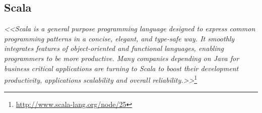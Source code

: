 \subsection{Scala} \label{bg_scala}
\textit{<<Scala is a general purpose programming language designed to express common programming patterns in a concise, elegant, and type-safe way. It smoothly integrates features of object-oriented and functional languages, enabling programmers to be more productive. Many companies depending on Java for business critical applications are turning to Scala to boost their development productivity, applications scalability and overall reliability.>>}\footnote{\url{http://www.scala-lang.org/node/25}}

